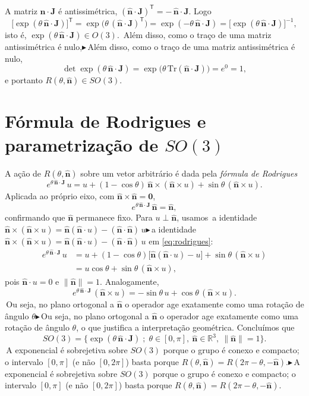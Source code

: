 \documentclass[12pt,a4paper]{article}   %
\newcommand{\nota}[1]{{\color{vermelho}%
  \ifmmode\blacktriangleright\,#1\else$\blacktriangleright$\,#1\fi}}
\newcommand{\R}{\mathbb{R}}
\newcommand{\nvec}{\hat{\bm{n}}}          %
\newcommand{\Jvec}{\bm{J}}                %
\begin{document}
\medskip
A matriz $\nvec\cdot\Jvec$ \'e antissim\'etrica,
$(\nvec\cdot\Jvec)^{\mathsf T}=-\,\nvec\cdot\Jvec$. Logo
\begin{equation}
\bigl[\exp(\theta\,\nvec\cdot\Jvec)\bigr]^{\mathsf T}
=\exp\!\bigl(\theta\,(\nvec\cdot\Jvec)^{\mathsf T}\bigr)
=\exp(-\theta\,\nvec\cdot\Jvec)
=\bigl[\exp(\theta\,\nvec\cdot\Jvec)\bigr]^{-1},
\end{equation}
isto \'e, $\exp(\theta\,\nvec\cdot\Jvec)\in O(3)$. \nota{Al\'em disso,
como o tra\c{c}o de uma matriz antissim\'etrica \'e nulo,}
\begin{equation}
\det\exp(\theta\,\nvec\cdot\Jvec)
=\exp\!\bigl(\theta\,\mathrm{Tr}(\nvec\cdot\Jvec)\bigr)=e^{0}=1,
\end{equation}
e portanto $R(\theta,\nvec)\in SO(3)$.

\section{F\'ormula de Rodrigues e parametriza\c{c}\~ao de $SO(3)$}

A a\c{c}\~ao de $R(\theta,\nvec)$ sobre um vetor arbitr\'ario \'e dada
pela \emph{f\'ormula de Rodrigues}
\begin{equation}
e^{\theta\,\nvec\cdot\Jvec}\,u
= u + (1-\cos\theta)\,\nvec\times(\nvec\times u) + \sin\theta\,(\nvec\times u).
\label{eq:rodrigues}
\end{equation}
Aplicada ao pr\'oprio eixo, com $\nvec\times\nvec=\bm 0$,
\begin{equation}
e^{\theta\,\nvec\cdot\Jvec}\,\nvec = \nvec,
\end{equation}
confirmando que $\nvec$ permanece fixo. Para $u\perp\nvec$, usamos
\nota{a identidade $\nvec\times(\nvec\times u)=\nvec(\nvec\cdot u)-(\nvec\cdot\nvec)\,u$} em \eqref{eq:rodrigues}:
\begin{align}
e^{\theta\,\nvec\cdot\Jvec}\,u
&= u + (1-\cos\theta)\bigl[\nvec(\nvec\cdot u)-u\bigr]+\sin\theta\,(\nvec\times u)
\nonumber\\
&= u\cos\theta + \sin\theta\,(\nvec\times u),
\end{align}
pois $\nvec\cdot u=0$ e $\lVert\nvec\rVert=1$. Analogamente,
\begin{equation}
e^{\theta\,\nvec\cdot\Jvec}\,(\nvec\times u)
= -\sin\theta\,u + \cos\theta\,(\nvec\times u).
\end{equation}
\nota{Ou seja, no plano ortogonal a $\nvec$ o operador age exatamente
como uma rota\c{c}\~ao de \^angulo $\theta$}, o que justifica a
interpreta\c{c}\~ao geom\'etrica. Conclu\'imos que
\begin{equation}
\boxed{\;SO(3)=\bigl\{\exp(\theta\,\nvec\cdot\Jvec)\;;\;
\theta\in[0,\pi],\ \nvec\in\R^{3},\ \lVert\nvec\rVert=1\bigr\}.\;}
\end{equation}
\nota{A exponencial \'e sobrejetiva sobre $SO(3)$ porque o grupo \'e
conexo e compacto; o intervalo $[0,\pi]$ (e n\~ao $[0,2\pi]$) basta
porque $R(\theta,\nvec)=R(2\pi-\theta,-\nvec)$.}
\end{document}
